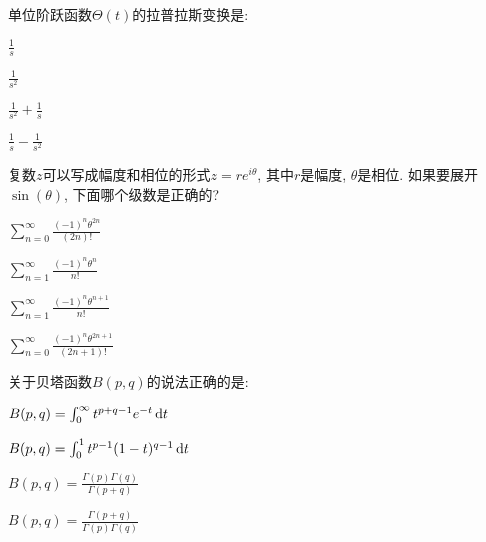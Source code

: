 \documentclass{njustexam}
\begin{document}




\begin{problem}
  单位阶跃函数$\Theta(t)$的拉普拉斯变换是:
  \begin{abcd}
    \item $\frac{1}{s}$
    \item $\frac{1}{s^2}$
    \item $\frac{1}{s^2} + \frac{1}{s}$
    \item $\frac{1}{s} - \frac{1}{s^2}$
  \end{abcd}

\end{problem}

\begin{problem}
复数$z$可以写成幅度和相位的形式$z = re^{i\theta}$, 其中$r$是幅度, $\theta$是相位. 
如果要展开$\sin(\theta)$, 下面哪个级数是正确的? 
\begin{abcd}
  \item $\sum_{n=0}^{\infty} \frac{(-1)^n \theta^{2n}}{(2n)!}$
  \item $\sum_{n=1}^{\infty} \frac{(-1)^n \theta^n}{n!}$
  \item $\sum_{n=1}^{\infty} \frac{(-1)^n \theta^{n+1}}{n!}$
  \item $\sum_{n=0}^{\infty} \frac{(-1)^n \theta^{2n+1}}{(2n+1)!}$

\end{abcd}
\end{problem}








\begin{problem}
  关于贝塔函数$B(p,  q)$的说法正确的是:
\begin{abcd}
  \item $B(p,  q) = \int_{0}^{\infty} t^{p+q-1}e^{-t} \mathop{}\!\mathrm{d} t$
  \item $B(p,  q) = \int_{0}^{1} t^{p-1}(1-t)^{q-1} \mathop{}\!\mathrm{d} t$
  \item $B(p,  q) = \frac{\Gamma(p)\Gamma(q)}{\Gamma(p+q)}$
  \item $B(p,  q) = \frac{\Gamma(p+q)}{\Gamma(p)\Gamma(q)}$
\end{abcd}
\end{problem}
\end{document}
